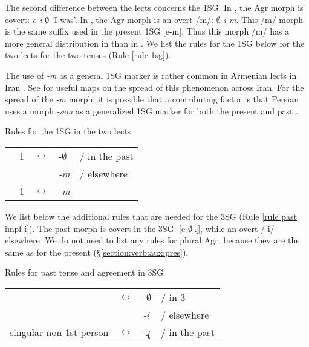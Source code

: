 The second difference between the lects concerns the 1SG. In {\seaSE}, the Agr morph is covert: \textit{{e-i-$\emptyset$}} `I was'. In {\iaIA}, the Agr morph is an overt /{m}/: \textit{{$\emptyset$-i-m}}. This /{m}/ morph is the same suffix used in the present 1SG [e-m]. Thus this morph /m/ has a more general distribution in {\iaIA} than in {\seaSE}. We list the rules for the 1SG below for the two lects for the two tenses (Rule \ref{rule 1sg}).

The use of \textit{-m} as a general 1SG marker is rather common in Armenian lects in Iran \citep[p. 103, feature 100.6]{Jahukyan-1972-ArmenianDiaolectology}. See \citet[55--56]{Vaux-Salmast} for useful maps on the spread of this phenomenon across Iran. For the spread of the \textit{{-m}} morph, it is possible that a contributing factor is that Persian uses a morph \textit{{-æm}} as a generalized 1SG marker for both the present and past \citep[229ff]{Mahootian-2002-PersianGrammar}. 

\begin{newruleblock}[rule 1sg]{Rules for the 1SG in the two lects}%
	\begin{center}
		\begin{tabular}{lllll}
			\textit{{\seaSE}} & 1{\sg} & $\leftrightarrow$ & -$\emptyset$ & / in the past\\
							  & & & \textit{{-m}} & / elsewhere\\
			\textit{{\iaIA}}  &	1{\sg} & $\leftrightarrow$ & \textit{{-m}} & \\
		\end{tabular}
	\end{center}
\end{newruleblock} 


We list below the additional rules that are needed for the {\iaIA} 3SG (Rule \ref{rule past impf i}). The past morph is covert in the 3SG: [e-$\emptyset$-ɻ], while an overt /-i/ elsewhere.  We do not need to list any rules for plural Agr, because they are the same as for the present (\S\ref{section:verb:aux:pres}). 

\begin{newruleblock}{Rules for past tense and agreement in 3SG}%
	\begin{center}
		\begin{tabular}{llll}
			\pst{} & $\leftrightarrow$ & \textit{{-$\emptyset$}} & / in 3{\sg}\\
			& & \textit{{-i}} &/ elsewhere\\
			singular non-1st person & $\leftrightarrow$ & \textit{{-ɻ}}& / in the past\\
		\end{tabular}
	\end{center}
\end{newruleblock} 

